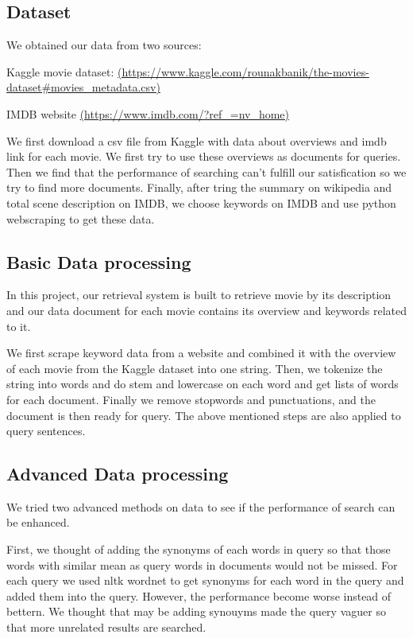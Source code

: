 \documentclass[sigconf,nonacm]{acmart}
\begin{document}
\subsection{Dataset}
We obtained our data from two sources:

Kaggle movie dataset:
\url{(https://www.kaggle.com/rounakbanik/the-movies-dataset#movies_metadata.csv)}

IMDB website
\url{(https://www.imdb.com/?ref_=nv_home)}

We first download a csv file from Kaggle with data about overviews and imdb link for each movie. We first try to use these overviews as documents for queries. Then we find that the performance of searching can't fulfill our satisfication so we try to find more documents. Finally, after tring the summary on wikipedia and total scene description on IMDB, we choose keywords on IMDB and use python webscraping to get these data.

\subsection{Basic Data processing}

In this project, our retrieval system is built to retrieve movie by its description and our data document for each movie contains its overview and keywords related to it.

We first scrape keyword data from a website and combined it with the overview of each movie from the Kaggle dataset into one string. Then, we tokenize the string into words and do stem and lowercase on each word and get lists of words for each document. Finally we remove stopwords and punctuations, and  the document is then ready for query. The above mentioned steps are also applied to query sentences.

\subsection{Advanced Data processing}

We tried two advanced methods on data to see if the performance of search can be enhanced.

First, we thought of adding the synonyms of each words in query so that those words with similar mean as query words in documents would not be missed. For each query we used nltk wordnet to get synonyms for each word in the query and added them into the query. However, the performance become worse instead of bettern. We thought that may be adding synouyms made the query vaguer so that more unrelated results are searched.
\end{document}

